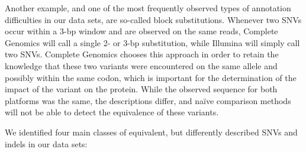 Another example, and one of the most frequently observed types of annotation difficulties in our data sets, are so-called block substitutions. Whenever two SNVs occur within a 3-bp window and are observed on the same reads, Complete Genomics will call a single 2- or 3-bp substitution, while Illumina will simply call two SNVs. Complete Genomics chooses this approach in order to retain the knowledge that these two variants were encountered on the same allele and possibly within the same codon, which is important for the determination of the impact of the variant on the protein. While the observed sequence for both platforms was the same, the descriptions differ, and naïve comparison methods will not be able to detect the equivalence of these variants.

We identified four main classes of equivalent, but differently described SNVs and indels in our data sets:

